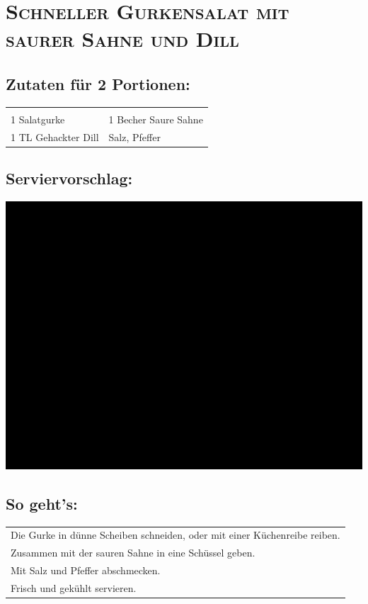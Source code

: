\section{\textsc{Schneller Gurkensalat mit saurer Sahne und Dill}}

\subsection*{Zutaten für 2 Portionen:}

\begin{tabular}{p{7.5cm} p{7.5cm}}
	& \\
	1 Salatgurke & 1 Becher Saure Sahne \\
	1 TL Gehackter Dill & Salz, Pfeffer
\end{tabular}

\subsection*{Serviervorschlag:}

\includegraphics[width=\textwidth]{img/ph.jpg} \cite{gurkensalatdill}

\subsection*{So geht's:}

\begin{tabular}{p{15cm}}
	\\
  Die Gurke in dünne Scheiben schneiden, oder mit einer Küchenreibe reiben.\\
  Zusammen mit der sauren Sahne in eine Schüssel geben.\\
  Mit Salz und Pfeffer abschmecken.\\
  Frisch und gekühlt servieren.
\end{tabular}
